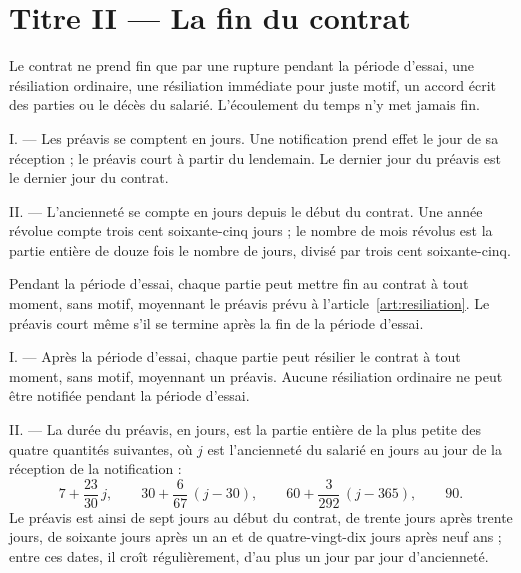 \section{Titre II --- La fin du contrat}

\label{art:causes}
Le contrat ne prend fin que par une rupture pendant la période d'essai, une
résiliation ordinaire, une résiliation immédiate pour juste motif, un accord
écrit des parties ou le décès du salarié. L'écoulement du temps n'y met
jamais fin.

\label{art:delais}
I. --- Les préavis se comptent en jours. Une notification prend effet le jour
de sa réception ; le préavis court à partir du lendemain. Le dernier jour du
préavis est le dernier jour du contrat.

II. --- L'ancienneté se compte en jours depuis le début du contrat. Une année
révolue compte trois cent soixante-cinq jours ; le nombre de mois révolus est
la partie entière de douze fois le nombre de jours, divisé par trois cent
soixante-cinq.

\label{art:rupture-essai}
Pendant la période d'essai, chaque partie peut mettre fin au contrat à tout
moment, sans motif, moyennant le préavis prévu à
l'article~\ref{art:resiliation}. Le préavis court même s'il se termine après
la fin de la période d'essai.

\label{art:resiliation}
I. --- Après la période d'essai, chaque partie peut résilier le contrat à tout
moment, sans motif, moyennant un préavis. Aucune résiliation ordinaire ne peut
être notifiée pendant la période d'essai.

II. --- La durée du préavis, en jours, est la partie entière de la plus petite
des quatre quantités suivantes, où $j$ est l'ancienneté du salarié en jours au
jour de la réception de la notification :
\[
  7 + \frac{23}{30}\,j, \qquad
  30 + \frac{6}{67}\,(j - 30), \qquad
  60 + \frac{3}{292}\,(j - 365), \qquad
  90.
\]
Le préavis est ainsi de sept jours au début du contrat, de trente jours après
trente jours, de soixante jours après un an et de quatre-vingt-dix jours après
neuf ans ; entre ces dates, il croît régulièrement, d'au plus un jour par jour
d'ancienneté.

